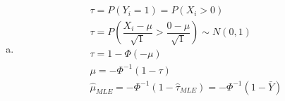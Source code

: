 \documentclass{article}
\begin{document}
\begin{flushleft}
\begin{enumerate}[(a)]
\item 
\begin{multline*}\\
\tau=P(Y_i=1)=P(X_i>0)\\
\tau=P\left(\dfrac{X_i-\mu}{\sqrt{1}}>\dfrac{0-\mu}{\sqrt{1}}\right)\sim N(0,1)\\
\tau=1-\Phi(-\mu)\\
\mu=-\Phi^{-1}(1-\tau)\\
\hat{\mu}_{MLE}=-\Phi^{-1}(1-\hat{\tau}_{MLE})=-\Phi^{-1}(1-\bar{Y})\\
\end{multline*}

\end{enumerate}


\end{flushleft}
\end{document}
